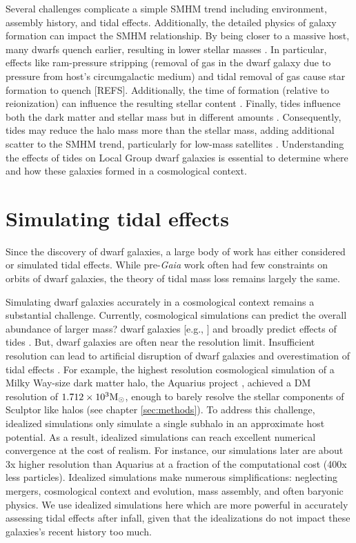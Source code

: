 Several challenges complicate a simple SMHM trend including environment,
assembly history, and tidal effects. Additionally, the detailed physics
of galaxy formation can impact the SMHM relationship. By being closer to
a massive host, many dwarfs quench earlier, resulting in lower stellar
masses \citep[e.g.,][]{christensen+2024}. In particular, effects like
ram-pressure stripping (removal of gas in the dwarf galaxy due to
pressure from host's circumgalactic medium) and tidal removal of gas
cause star formation to quench {[}REFS{]}. Additionally, the time of
formation (relative to reionization) can influence the resulting stellar
content \citep{kim+2024}. Finally, tides influence both the dark matter
and stellar mass but in different amounts \citep[e.g.,][]{PNM2008}.
Consequently, tides may reduce the halo mass more than the stellar mass,
adding additional scatter to the SMHM trend, particularly for low-mass
satellites \citep[e.g.,][]{fattahi+2018}. Understanding the effects of
tides on Local Group dwarf galaxies is essential to determine where and
how these galaxies formed in a cosmological context.

\section{Simulating tidal effects}\label{sec:tidal_theory}

Since the discovery of dwarf galaxies, a large body of work has either
considered or simulated tidal effects. While pre-\emph{Gaia} work often
had few constraints on orbits of dwarf galaxies, the theory of tidal
mass loss remains largely the same.

Simulating dwarf galaxies accurately in a cosmological context remains a
substantial challenge. Currently, cosmological simulations can predict
the overall abundance of larger mass? dwarf galaxies {[}e.g., {]} and
broadly predict effects of tides \citep[e.g.,][]{riley+2024}. But, dwarf
galaxies are often near the resolution limit. Insufficient resolution
can lead to artificial disruption of dwarf galaxies and overestimation
of tidal effects \citep[e.g.,][]{santos-santos+2025}. For example, the
highest resolution cosmological simulation of a Milky Way-size dark
matter halo, the Aquarius project \citep{springel+2008}, achieved a DM
resolution of \(1.712 \times10^3 {\rm M}_{\odot}\), enough to barely resolve the
stellar components of Sculptor like halos (see chapter
\ref{sec:methods}). To address this challenge, idealized simulations
only simulate a single subhalo in an approximate host potential. As a
result, idealized simulations can reach excellent numerical convergence
at the cost of realism. For instance, our simulations later are about 3x
higher resolution than Aquarius at a fraction of the computational cost
(400x less particles). Idealized simulations make numerous
simplifications: neglecting mergers, cosmological context and evolution,
mass assembly, and often baryonic physics. We use idealized simulations
here which are more powerful in accurately assessing tidal effects after
infall, given that the idealizations do not impact these galaxies's
recent history too much.

